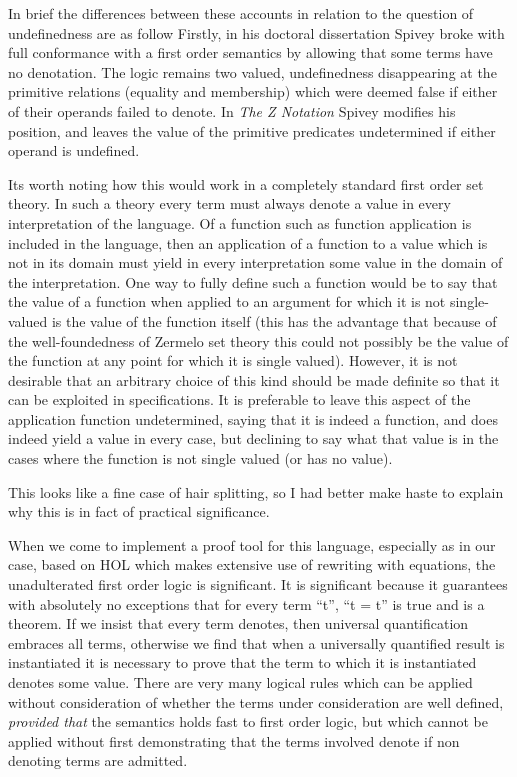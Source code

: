 \documentclass[10pt,titlepage]{book}
\begin{document}
In brief the differences between these accounts in relation to the question of undefinedness are as follow
Firstly, in his doctoral dissertation Spivey broke with full conformance with a first order semantics by allowing that some terms have no denotation.
The logic remains two valued, undefinedness disappearing at the primitive relations (equality and membership) which were deemed false if either of their operands failed to denote.
In {\it The Z Notation} Spivey modifies his position, and leaves the value of the primitive predicates undetermined if either operand is undefined.

Its worth noting how this would work in a completely standard first order set theory.
In such a theory every term must always denote a value in every interpretation of the language.
Of a function such as function application is included in the language, then an application of a function to a value which is not in its domain must yield in every interpretation some value in the domain of the interpretation.
One way to fully define such a function would be to say that the value of a function when applied to an argument for which it is not single-valued is the value of the function itself (this has the advantage that because of the well-foundedness of Zermelo set theory this could not possibly be the value of the function at any point for which it is single valued).
However, it is not desirable that an arbitrary choice of this kind should be made definite so that it can be exploited in specifications.
It is preferable to leave this aspect of the application function undetermined, saying that it is indeed a function, and does indeed yield a value in every case, but declining to say what that value is in the cases where the function is not single valued (or has no value).

This looks like a fine case of hair splitting, so I had better make haste to explain why this is in fact of practical significance.

When we come to implement a proof tool for this language, especially as in our case, based on HOL which makes extensive use of rewriting with equations, the unadulterated first order logic is significant.
It is significant because it guarantees with absolutely no exceptions that for every term ``t'', ``t = t'' is true and is a theorem.
If we insist that every term denotes, then universal quantification embraces all terms, otherwise we find that when a universally quantified result is instantiated it is necessary to prove that the term to which it is instantiated denotes some value.
There are very many logical rules which can be applied without consideration of whether the terms under consideration are well defined, {\it provided that} the semantics holds fast to first order logic, but which cannot be applied without first demonstrating that the terms involved denote if non denoting terms are admitted.
\end{document}
